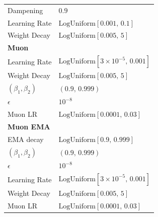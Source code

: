 \begin{table}[h]
\begin{minipage}[t]{0.48\textwidth}
\begin{tabular}{@{}ll@{}}
\quad Dampening & $0.9$ \\
\quad Learning Rate & $\mathrm{LogUniform}[0.001,\,0.1]$ \\
\quad Weight Decay & $\mathrm{LogUniform}[0.005,\,5]$ \\
\midrule
\multicolumn{2}{l}{\textbf{Muon}} \\
\quad Learning Rate & $\mathrm{LogUniform}[3 \!\times\! 10^{-5},\,0.001]$ \\
\quad Weight Decay & $\mathrm{LogUniform}[0.005,\,5]$ \\
\quad $(\beta_1, \beta_2)$ & $(0.9,\,0.999)$ \\
\quad $\epsilon$ & $10^{-8}$ \\
\quad Muon LR & $\mathrm{LogUniform}[0.0001,\,0.03]$ \\
\midrule
\multicolumn{2}{l}{\textbf{Muon EMA}} \\
\quad EMA decay & $\mathrm{LogUniform}[0.9,\,0.999]$ \\
\quad $(\beta_1, \beta_2)$ & $(0.9,\,0.999)$ \\
\quad $\epsilon$ & $10^{-8}$ \\
\quad Learning Rate & $\mathrm{LogUniform}[3 \!\times\! 10^{-5},\,0.001]$ \\
\quad Weight Decay & $\mathrm{LogUniform}[0.005,\,5]$ \\
\quad Muon LR & $\mathrm{LogUniform}[0.0001,\,0.03]$ \\
\bottomrule
\end{tabular}
\end{minipage}

\end{table}